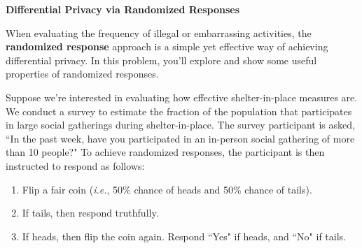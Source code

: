 \documentclass[12pt, addpoints]{exam}
\newcommand{\1}{\mathbf{1}}
\newcommand{\R}{\mathbb{R}}
\begin{document}
\begin{questions}

\question[30] \textbf{Differential Privacy via Randomized Responses}

When evaluating the frequency of illegal or embarrassing activities, the \textbf{randomized response} approach is a simple yet effective way of achieving differential privacy. In this problem, you'll explore and show some useful properties of randomized responses.

Suppose we're interested in evaluating how effective shelter-in-place measures are. We conduct a survey to estimate the fraction of the population that participates in large social gatherings during shelter-in-place. The survey participant is asked, ``In the past week, have you participated in an in-person social gathering of more than 10 people?" To achieve randomized responses, the participant is then instructed to respond as follows:
\begin{enumerate}
    \item Flip a fair coin (\textit{i.e.}, 50\% chance of heads and 50\% chance of tails).
    \item If tails, then respond truthfully.
    \item If heads, then flip the coin again. Respond ``Yes" if heads, and ``No" if tails.
\end{enumerate}

\end{questions}
\end{document}
